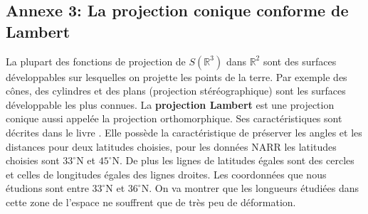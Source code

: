 \documentclass[a4paper,11pt]{article}
\numberwithin{equation}{section}
\begin{document}
\subsection{Annexe 3: La projection conique conforme de Lambert}
\label{proj-Lambert}
La plupart des fonctions de projection de $S(\mathbb{R}^3)$ dans $\mathbb{R}^2$ sont des surfaces développables sur lesquelles on projette les points de la terre. Par exemple des cônes, des cylindres et des plans (projection stéréographique) sont les surfaces développable les plus connues. La \textbf{projection Lambert} est une projection conique aussi appelée la projection orthomorphique. Ses caractéristiques sont décrites dans le livre \cite{grafarend2014map}. Elle possède la caractéristique de préserver les angles et les distances pour deux latitudes choisies, pour les données NARR les latitudes choisies sont $33^{\circ}$N et $45^{\circ}$N. De plus les lignes de latitudes égales sont des cercles et celles de longitudes égales des lignes droites. Les coordonnées que nous étudions sont entre $33^{\circ}$N et $36^{\circ}$N. On va montrer que les longueurs étudiées dans cette zone de l'espace ne souffrent que de très peu de déformation. 
\end{document}
